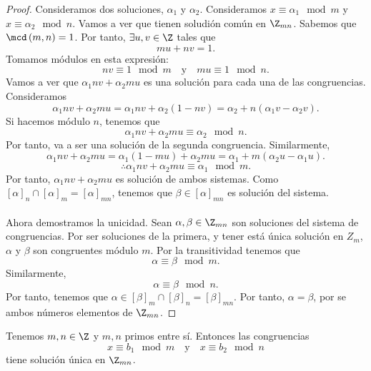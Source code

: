 \begin{proof}
Consideramos dos soluciones, $\displaystyle \alpha_{1} $ y $\displaystyle \alpha_{2} $. Consideramos $\displaystyle x \equiv \alpha_{1} \mod m $ y $\displaystyle x \equiv \alpha_{2} \mod n $. Vamos a ver que tienen soludión común en $\displaystyle \Z_{mn} $. Sabemos que $\displaystyle \mcd\left(m,n\right) = 1 $. Por tanto, $\displaystyle \exists u,v \in \Z $ tales que 
\[mu + nv = 1 .\]
Tomamos módulos en esta expresión:
\[nv \equiv 1 \mod m \quad \text{y} \quad mu \equiv 1 \mod n .\]
Vamos a ver que $\displaystyle \alpha_{1}nv + \alpha_{2}mu $ es una solución para cada una de las congruencias. Consideramos 
\[\alpha_{1}nv + \alpha_{2}mu = \alpha_{1}nv + \alpha_{2}\left(1-nv\right) = \alpha_{2} + n\left(\alpha_{1}v-\alpha_{2}v\right) .\]
Si hacemos módulo $\displaystyle n $, tenemos que
\[\alpha_{1}nv + \alpha_{2}mu \equiv \alpha_{2} \mod n .\]
Por tanto, va a ser una solución de la segunda congruencia. Similarmente, 
\[\alpha_{1}nv + \alpha_{2}mu = \alpha_{1}\left(1-mu\right)+\alpha_{2}mu = \alpha_{1}+m\left(\alpha_{2}u-\alpha_{1}u\right) .\]
\[\therefore \alpha_{1}nv + \alpha_{2}mu \equiv \alpha_{1} \mod m .\]
Por tanto, $\displaystyle \alpha_{1}nv + \alpha_{2}mu $ es solución de ambos sistemas. Como $\displaystyle \left[\alpha \right] _{n} \cap \left[\alpha \right] _{m} = \left[\alpha \right] _{mn} $, tenemos que $\displaystyle \beta \in \left[\alpha \right] _{mn} $ es solución del sistema. \\ \\
Ahora demostramos la unicidad. Sean $\displaystyle \alpha, \beta \in \Z_{mn} $ son soluciones del sistema de congruencias. Por ser soluciones de la primera, y tener está única solución en $\displaystyle Z_{m} $, $\displaystyle \alpha  $ y $\displaystyle \beta  $ son congruentes módulo $\displaystyle m $. Por la transitividad tenemos que 
\[\alpha \equiv \beta \mod m .\]
Similarmente, 
\[\alpha \equiv \beta \mod n .\]
Por tanto, tenemos que $\displaystyle \alpha \in \left[\beta \right] _{m}\cap\left[\beta \right] _{n} = \left[\beta \right] _{mn} $. Por tanto, $\displaystyle \alpha = \beta  $, por se ambos números elementos de $\displaystyle \Z_{mn} $.
\end{proof}

\begin{fcolorary}[]
\normalfont Tenemos $\displaystyle m,n \in \Z $ y $\displaystyle m,n $ primos entre sí. Entonces las congruencias
\[x \equiv b_{1} \mod m \quad \text{y} \quad x \equiv b_{2} \mod n \]
tiene solución única en $\displaystyle \Z_{mn} $.
\end{fcolorary}

